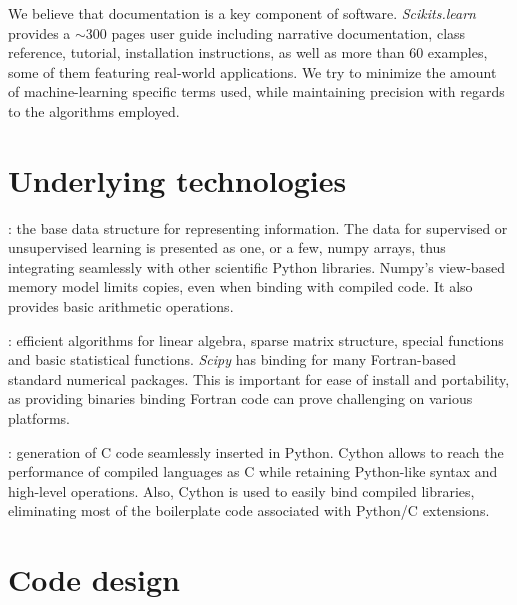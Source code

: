 \documentclass[twoside,11pt]{article}
\begin{document}
\smallskip {}
%
We believe that documentation is a key component of software.
\emph{Scikits.learn} provides a $\sim$300 pages user guide including
narrative documentation, class reference, tutorial, installation
instructions, as well as more than 60 examples, some of them featuring
real-world applications. We try to minimize the amount of
machine-learning specific terms used, while maintaining precision with
regards to the algorithms employed.


\section{Underlying technologies}



:
%
the base data structure for representing
information. The data for supervised or unsupervised learning is
presented as one, or a few, numpy arrays, thus integrating seamlessly
with other scientific Python libraries. Numpy's view-based memory 
model limits copies, even when binding with compiled code. It also 
provides basic arithmetic operations. 

\smallskip
{}:
%
efficient algorithms for linear algebra, sparse matrix structure, special
functions and basic statistical functions. {\sl Scipy} has binding for
many Fortran-based standard numerical packages. This is important for
ease of install and portability, as providing binaries binding Fortran
code can prove challenging on various platforms. 

\smallskip
{}:
%
generation of C code seamlessly inserted in Python. Cython allows to
reach the performance of compiled languages as C while retaining
Python-like syntax and high-level operations. Also, Cython is used to
easily bind compiled libraries, eliminating most of the boilerplate code
associated with Python/C extensions.


\section{Code design}
\end{document}
